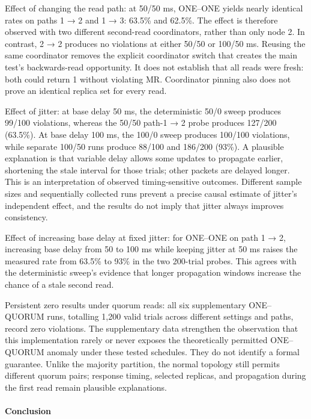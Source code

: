 Effect of changing the read path: at 50/50 ms, ONE--ONE yields nearly identical rates on paths 1 → 2 and 1 → 3: 63.5\% and 62.5\%. The effect is therefore observed with two different second-read coordinators, rather than only node 2. In contrast, 2 → 2 produces no violations at either 50/50 or 100/50 ms. Reusing the same coordinator removes the explicit coordinator switch that creates the main test's backwards-read opportunity. It does not establish that all reads were fresh: both could return 1 without violating MR. Coordinator pinning also does not prove an identical replica set for every read.

Effect of jitter: at base delay 50 ms, the deterministic 50/0 sweep produces 99/100 violations, whereas the 50/50 path-1 → 2 probe produces 127/200 (63.5\%). At base delay 100 ms, the 100/0 sweep produces 100/100 violations, while separate 100/50 runs produce 88/100 and 186/200 (93\%). A plausible explanation is that variable delay allows some updates to propagate earlier, shortening the stale interval for those trials; other packets are delayed longer. This is an interpretation of observed timing-sensitive outcomes. Different sample sizes and sequentially collected runs prevent a precise causal estimate of jitter's independent effect, and the results do not imply that jitter always improves consistency.

Effect of increasing base delay at fixed jitter: for ONE--ONE on path 1 → 2, increasing base delay from 50 to 100 ms while keeping jitter at 50 ms raises the measured rate from 63.5\% to 93\% in the two 200-trial probes. This agrees with the deterministic sweep's evidence that longer propagation windows increase the chance of a stale second read.

Persistent zero results under quorum reads: all six supplementary ONE--QUORUM runs, totalling 1,200 valid trials across different settings and paths, record zero violations. The supplementary data strengthen the observation that this implementation rarely or never exposes the theoretically permitted ONE--QUORUM anomaly under these tested schedules. They do not identify a formal guarantee. Unlike the majority partition, the normal topology still permits different quorum pairs; response timing, selected replicas, and propagation during the first read remain plausible explanations.

\paragraph{Conclusion}\label{mr:conclusion}

